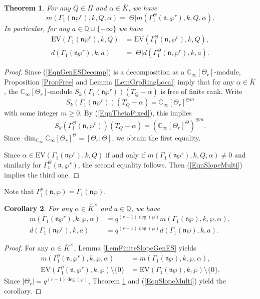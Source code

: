 \documentclass[11pt]{amsart}
\theoremstyle{plain}
\newtheorem{thm}{Theorem}[section]
\newtheorem{cor}[thm]{Corollary}
\theoremstyle{definition}
\newcommand{\EV}{\mathrm{EV}}
\newcommand{\bQ}{\mathbb{Q}}
\newcommand{\frn}{\mathfrak{n}}
\newcommand{\Cinf}{\mathbb{C}_{\infty}}
\begin{document}
\begin{thm}\label{ThmMultiTheta}
	For any $Q\in \Pi$ and $\alpha\in \bar{K}$, we have
	\[
	m(\Gamma_1(\frn\wp^r),k,Q,\alpha)=|\Theta| m(\Gamma_1^\Theta(\frn,\wp^r),k,Q,\alpha).
	\]
	In particular, for any $a\in \bQ\cup\{+\infty\}$ we have
	\[
	\begin{aligned}
	\EV(\Gamma_1(\frn\wp^r),k,Q)&=\EV(\Gamma_1^\Theta(\frn,\wp^r),k,Q),\\
	 d(\Gamma_1(\frn\wp^r),k,a)&=|\Theta|d(\Gamma_1^\Theta(\frn,\wp^r),k,a).
	\end{aligned}
	\]
\end{thm}
\begin{proof}
	Since (\ref{EqnGenESDecomp}) is a decomposition as a $\Cinf[\Theta_r]$-module, Proposition \ref{PropFree} and Lemma \ref{LemGrpRingLocal} imply that for any $
	\alpha\in \bar{K}$, the $\Cinf[\Theta_r]$-module $S_k(\Gamma_1(\frn\wp^r))(T_Q-\alpha)$
	is free of finite rank. Write
	\[
	S_k(\Gamma_1(\frn\wp^r))(T_Q-\alpha)=\Cinf[\Theta_r]^{\oplus m}
	\]
	with some integer $m\geq 0$.
	By (\ref{EqnThetaFixed}), this implies
	\[
	S_k(\Gamma_1^\Theta(\frn,\wp^r))(T_Q-\alpha)=(\Cinf[\Theta_r]^\Theta)^{\oplus m}.
	\]
	Since $\dim_{\Cinf}\Cinf[\Theta_r]^\Theta=[\Theta_r:\Theta]$, we obtain the first equality. 
	
	Since $\alpha\in \EV(\Gamma_1(\frn\wp^r),k,Q)$ if and only if $m(\Gamma_1(\frn\wp^r),k,Q,\alpha)\neq 0$ and similarly for
	$\Gamma_1^\Theta(\frn,\wp^r)$, the second equality follows. Then (\ref{EqnSlopeMulti}) implies the third one.
\end{proof}

Note that $\Gamma_1^p(\frn,\wp)=\Gamma_1(\frn\wp)$. 

\begin{cor}\label{CorMultiSlope}
	For any $\alpha\in \bar{K}^\times$ and $a\in \bQ$, we have
	\[
	\begin{aligned}
		m(\Gamma_1(\frn\wp^r),k,\wp,\alpha)&=q^{(r-1)\deg(\wp)}m(\Gamma_1(\frn\wp),k,\wp,\alpha),\\
		d(\Gamma_1(\frn\wp^r),k,a)&=q^{(r-1)\deg(\wp)}d(\Gamma_1(\frn\wp),k,a).
	\end{aligned}
	\]
\end{cor}
\begin{proof}
	For any $\alpha\in \bar{K}^\times$, Lemma \ref{LemFiniteSlopeGenES} yields 
	\[
	\begin{aligned}
	m(\Gamma_1^p(\frn,\wp^r),k,\wp,\alpha)&=m(\Gamma_1(\frn\wp),k,\wp,\alpha),\\
	\EV(\Gamma_1^p(\frn,\wp^r),k,\wp)\setminus\{0\}&=\EV(\Gamma_1(\frn\wp),k,\wp)\setminus\{0\}.
	\end{aligned}
	\]
	Since $|\Theta_r|=q^{(r-1)\deg(\wp)}$, Theorem \ref{ThmMultiTheta} and (\ref{EqnSlopeMulti}) yield the corollary.
\end{proof}
\end{document}
